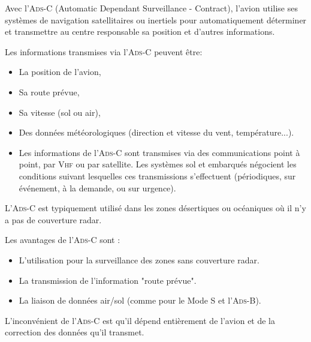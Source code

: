 Avec l'\textsc{Ads-C} (Automatic Dependant Surveillance - Contract), l'avion utilise ses systèmes de navigation satellitaires ou inertiels pour automatiquement déterminer et transmettre au centre responsable sa position et d'autres informations.

Les informations transmises via l'\textsc{Ads-C} peuvent être:
\begin{itemize}
\item La position de l'avion,
\item Sa route prévue,
\item Sa vitesse (sol ou air),
\item Des données météorologiques (direction et vitesse du vent, température...).
\item Les informations de l'\textsc{Ads-C} sont transmises via des communications point à point, par \textsc{Vhf} ou par satellite. Les systèmes sol et embarqués négocient les conditions suivant lesquelles ces transmissions s'effectuent (périodiques, sur événement, à la demande, ou sur urgence).
\end{itemize}\medskip

L'\textsc{Ads-C} est typiquement utilisé dans les zones désertiques ou océaniques où il n'y a pas de couverture radar.

Les avantages de l'\textsc{Ads-C} sont :
\begin{itemize}
\item L'utilisation pour la surveillance des zones sans couverture radar.
\item La transmission de l'information "route prévue".
\item La liaison de données air/sol (comme pour le Mode S et l'\textsc{Ads-B}).
\end{itemize}\medskip

L'inconvénient de l'\textsc{Ads-C} est qu'il dépend entièrement de l'avion et de la correction des données qu'il transmet.




